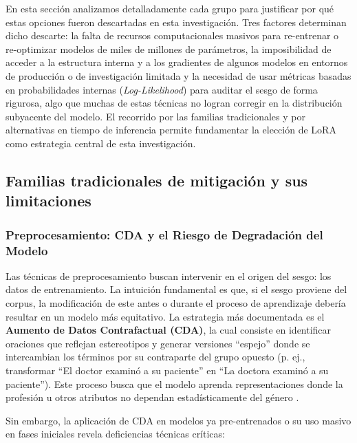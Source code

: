 \documentclass[12pt,a4paper]{report}
\begin{document}
En esta sección analizamos detalladamente cada grupo para justificar por qué estas opciones fueron descartadas en esta investigación. Tres factores determinan dicho descarte: 
la falta de recursos computacionales masivos para re-entrenar o re-optimizar modelos de miles de millones de parámetros, 
la imposibilidad de acceder a la estructura interna y a los gradientes de algunos modelos en entornos de producción o de investigación limitada y 
la necesidad de usar métricas basadas en probabilidades internas (\textit{Log-Likelihood}) para auditar el sesgo de forma rigurosa, algo que muchas 
de estas técnicas no logran corregir en la distribución subyacente del modelo. El recorrido por las familias tradicionales y por alternativas en tiempo 
de inferencia permite fundamentar la elección de LoRA como estrategia central de esta investigación.

\subsection{Familias tradicionales de mitigación y sus limitaciones}

\subsubsection{Preprocesamiento: CDA y el Riesgo de Degradación del Modelo}

Las técnicas de preprocesamiento buscan intervenir en el origen del sesgo: los datos de entrenamiento. La intuición fundamental es que, si el sesgo proviene del corpus, la modificación de este antes o durante el proceso de aprendizaje debería resultar en un modelo más equitativo. La estrategia más documentada es el \textbf{Aumento de Datos Contrafactual (CDA)}, la cual consiste en identificar oraciones que reflejan estereotipos y generar versiones ``espejo'' donde se intercambian los términos por su contraparte del grupo opuesto (p. ej., transformar ``El doctor examinó a su paciente'' en ``La doctora examinó a su paciente''). Este proceso busca que el modelo aprenda representaciones donde la profesión u otros atributos no dependan estadísticamente del género \cite{meade_empirical_2021}.

Sin embargo, la aplicación de CDA en modelos ya pre-entrenados o su uso masivo en fases iniciales revela deficiencias técnicas críticas:
\end{document}
